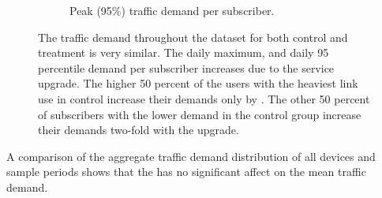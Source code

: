 \begin{figure}[ht]
\begin{minipage}{1\linewidth}
\begin{subfigure}[b]{0.33\linewidth}
               \caption{Peak (95\%)
traffic demand per subscriber.\label{fig:CDF-data-rate-perc95}}
\end{subfigure}
%
\end{minipage}
\caption{The traffic demand throughout the dataset for both control and 
treatment is very similar. The daily maximum, and daily 95 percentile 
demand per subscriber increases due to the service upgrade. The 
higher 50 percent of the users with the heaviest link use in control increase 
their demands only by . The other 50 percent of subscribers with the 
lower demand in the control group increase their demands two-fold with the 
upgrade.}
\label{fig:traffic-demand-cdf}
\end{figure}


A comparison of the aggregate traffic demand distribution of all devices 
and sample periods shows that the \treatment{} has no significant affect on the 
mean traffic demand. 
